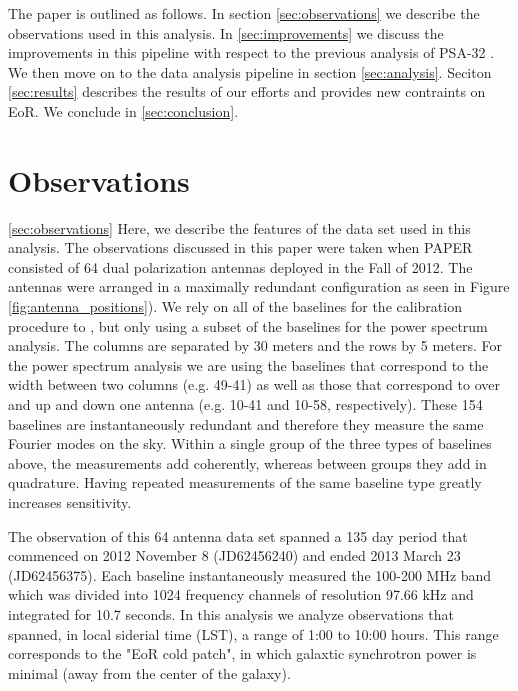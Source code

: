 \documentclass[twocolumn,numberedappendix]{emulateapj}
\begin{document}
The paper is outlined as follows. In section \ref{sec:observations} we describe
the observations used in this analysis. In \ref{sec:improvements} we discuss the
improvements in this pipeline with respect to the previous analysis of PSA-32
\cite{parsons_et_al2014a}. We then move on to the data analysis pipeline in
section \ref{sec:analysis}. Seciton \ref{sec:results} describes the results of
 our efforts and provides new contraints on EoR. We conclude in
\ref{sec:conclusion}.


\section{Observations}\ref{sec:observations}
Here, we describe the features of the data set used in this analysis. 
The observations discussed in this paper were taken when PAPER consisted of 64
dual polarization antennas deployed in the Fall of 2012.  The antennas were
arranged in a maximally redundant configuration as seen in Figure
\ref{fig:antenna_positions}). We rely on all
of the baselines for the calibration procedure to , but only using a
subset of the baselines for the power spectrum analysis. The columns are
separated by 30 meters and the rows by 5 meters. For the power spectrum analysis
we are using the baselines that correspond to the width between two columns
(e.g.  49-41) as well as those that correspond to over and up and down one
antenna (e.g. 10-41 and 10-58, respectively). These 154 baselines are
instantaneously redundant and therefore they measure the same Fourier modes on
the sky. Within a single group of the three types of baselines above, the
measurements add coherently, whereas between groups they add in quadrature.
Having repeated measurements of the same baseline type greatly increases
sensitivity. 

The observation of this 64 antenna data set spanned a 135 day period that
commenced on 2012 November 8 (JD62456240) and ended  2013 March 23 (JD62456375). 
Each baseline instantaneously measured the 100-200 MHz band which was divided
into 1024 frequency channels of resolution 97.66 kHz and integrated for 10.7
seconds. In this analysis we analyze observations that spanned, in local
siderial time (LST), a range of 1:00 to 10:00 hours. This range corresponds to
the "EoR cold patch", in which galaxtic synchrotron power is minimal (away from
the center of the galaxy).
\end{document}
